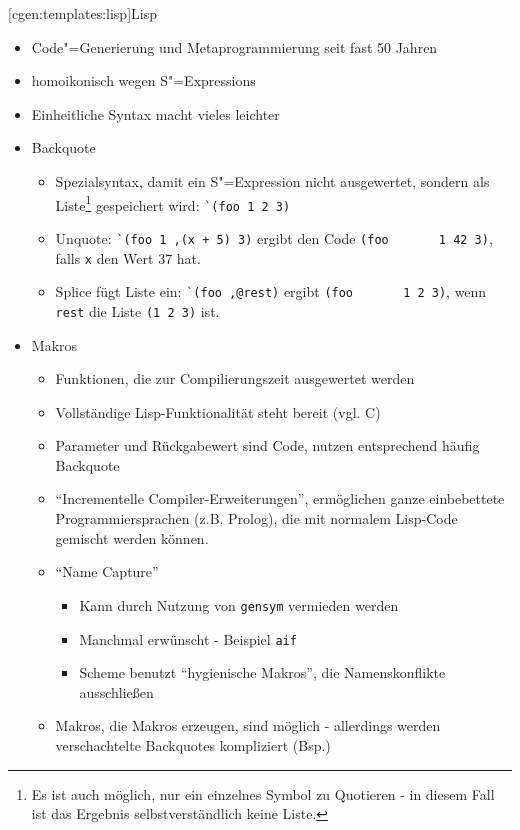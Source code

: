 \documentclass[a4paper, bibgerm]{book}
\newcommand\icode[1]{\lstinline?#1?}
\newcommand\lsubsection{}
\newcommand{\sexp}{S"=Expression}
\newcommand{\sexps}{S"=Expressions}
\newcommand{\cgen}{Code"=Generierung}
\begin{document}
\lsubsection[cgen:templates:lisp]{Lisp}

\begin{itemize}
\item \cgen{} und Metaprogrammierung seit fast 50 Jahren
\item homoikonisch wegen \sexps{}
\item Einheitliche Syntax macht vieles leichter
\end{itemize}

\begin{itemize}
\item Backquote
  \begin{itemize}
  \item Spezialsyntax, damit ein \sexp{} nicht ausgewertet, sondern als
    Liste\footnote{Es ist auch möglich, nur ein einzelnes Symbol zu
      Quotieren - in diesem Fall ist das Ergebnis selbstverständlich
      keine Liste.} gespeichert wird: \icode{`(foo 1 2 3)}
  \item Unquote: \icode{`(foo 1 ,(x + 5) 3)} ergibt den Code \icode{(foo
      1 42 3)}, falls \icode{x} den Wert 37 hat.
  \item Splice fügt Liste ein: \icode{`(foo ,@rest)} ergibt \icode{(foo
      1 2 3)}, wenn \icode{rest} die Liste \icode{(1 2 3)} ist.
  \end{itemize}
\item Makros
  \begin{itemize}
  \item Funktionen, die zur Compilierungszeit ausgewertet werden
  \item Vollständige Lisp-Funktionalität steht bereit (vgl. C)
  \item Parameter und Rückgabewert sind Code, nutzen entsprechend häufig Backquote
  \item "`Incrementelle Compiler-Erweiterungen"', ermöglichen ganze
    einbebettete Programmiersprachen (z.B. Prolog), die mit normalem
    Lisp-Code gemischt werden können.
  \item "`Name Capture"'
    \begin{itemize}
    \item Kann durch Nutzung von \icode{gensym} vermieden werden
    \item Manchmal erwünscht - Beispiel \icode{aif}\cite{OnLisp}
    \item Scheme benutzt "`hygienische Makros"', die Namenskonflikte ausschließen
    \end{itemize}
  \item Makros, die Makros erzeugen, sind möglich - allerdings werden
    verschachtelte Backquotes kompliziert (Bsp.)
  \end{itemize}
\end{itemize}
\end{document}

